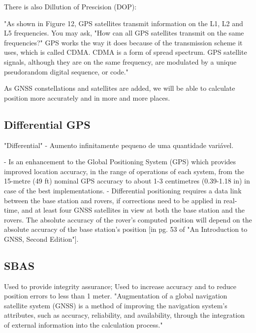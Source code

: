There is also Dillution of Prescision (DOP): %

"As shown in Figure 12, GPS satellites transmit information on the L1, L2 and L5 frequencies. You may ask, "How can all GPS satellites
transmit on the same frequencies?"
GPS works the way it does because of the transmission scheme it uses, which is called CDMA. CDMA is a form of spread spectrum. GPS satellite signals, although they are on the same frequency, are modulated by a unique pseudorandom digital sequence, or code."

As GNSS constellations and satellites are added, we will be able to calculate position more accurately and in more and more places.


\subsection{Differential GPS}\label{sec:II_gnss_dgps}

"Differential" - Aumento infinitamente pequeno de uma quantidade variável.

- Is an enhancement to the Global Positioning System (GPS) which provides improved location accuracy, in the range of operations of each system, from the 15-metre (49 ft) nominal GPS accuracy to about 1-3 centimetres (0.39-1.18 in) in case of the best implementations.
- Differential positioning requires a data link between the base station and rovers, if corrections need to be applied in real-time, and at least four GNSS satellites in view at both the base station and the rovers. The absolute accuracy of the rover's computed position will depend on the absolute accuracy of the base station's position [in pg. 53 of "An Introduction to GNSS, Second Edition"].

\subsection{SBAS}\label{sec:II_gnss_sbas}

Used to provide integrity assurance;
Used to increase accuracy and to reduce position errors to less than 1 meter.
"Augmentation of a global navigation satellite system (GNSS) is a method of improving the navigation system's attributes, such as accuracy, reliability, and availability, through the integration of external information into the calculation process."

